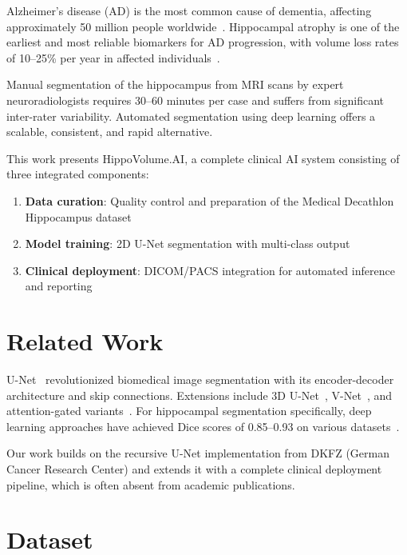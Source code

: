 \documentclass[12pt,a4paper,twocolumn]{article}
\begin{document}
Alzheimer's disease (AD) is the most common cause of dementia, affecting approximately 50 million people worldwide~\cite{who2019}. Hippocampal atrophy is one of the earliest and most reliable biomarkers for AD progression, with volume loss rates of 10--25\% per year in affected individuals~\cite{jack2010}.

Manual segmentation of the hippocampus from MRI scans by expert neuroradiologists requires 30--60 minutes per case and suffers from significant inter-rater variability. Automated segmentation using deep learning offers a scalable, consistent, and rapid alternative.

This work presents HippoVolume.AI, a complete clinical AI system consisting of three integrated components:
\begin{enumerate}[nosep]
    \item \textbf{Data curation}: Quality control and preparation of the Medical Decathlon Hippocampus dataset
    \item \textbf{Model training}: 2D U-Net segmentation with multi-class output
    \item \textbf{Clinical deployment}: DICOM/PACS integration for automated inference and reporting
\end{enumerate}

\section{Related Work}

U-Net~\cite{ronneberger2015} revolutionized biomedical image segmentation with its encoder-decoder architecture and skip connections. Extensions include 3D U-Net~\cite{cicek2016}, V-Net~\cite{milletari2016}, and attention-gated variants~\cite{oktay2018}. For hippocampal segmentation specifically, deep learning approaches have achieved Dice scores of 0.85--0.93 on various datasets~\cite{thyreau2018,liu2020}.

Our work builds on the recursive U-Net implementation from DKFZ (German Cancer Research Center) and extends it with a complete clinical deployment pipeline, which is often absent from academic publications.

\section{Dataset}
\end{document}
